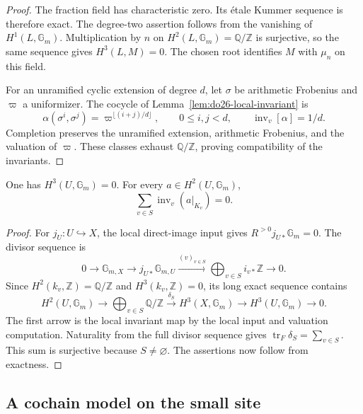 \begin{proof}
The fraction field has characteristic zero. Its \'etale Kummer sequence
is therefore exact. The degree-two assertion follows from the vanishing
of \(H^1(L,\mathbb G_m)\). Multiplication by \(n\) on
\(H^2(L,\mathbb G_m)=\mathbb Q/\mathbb Z\) is surjective, so the
same sequence gives \(H^3(L,M)=0\). The chosen root identifies
\(M\) with \(\mu_n\) on this field.

For an unramified cyclic extension of degree \(d\), let
\(\sigma\) be arithmetic Frobenius and \(\varpi\) a uniformizer.
The cocycle of Lemma~\ref{lem:do26-local-invariant} is
\begin{equation}
\label{eq:do27-carry}
 \alpha(\sigma^i,\sigma^j)=
 \varpi^{\lfloor(i+j)/d\rfloor},\qquad 0\leq i,j<d,
 \qquad \operatorname{inv}_v[\alpha]=1/d.
\end{equation}
Completion preserves the unramified extension, arithmetic Frobenius,
and the valuation of \(\varpi\). These classes exhaust
\(\mathbb Q/\mathbb Z\), proving compatibility of the invariants.
\end{proof}

\begin{lemma}
\label{lem:do27-open}
One has \(H^3(U,\mathbb G_m)=0\). For every
\(a\in H^2(U,\mathbb G_m)\),
\[
 \sum_{v\in S}\operatorname{inv}_v(a|_{K_v})=0.
\]
\end{lemma}

\begin{proof}
For \(j_U:U\hookrightarrow X\), the local direct-image input gives
\(R^{>0}j_{U*}\mathbb G_m=0\). The divisor sequence is
\[
 0\to\mathbb G_{m,X}\to j_{U*}\mathbb G_{m,U}
    \xrightarrow{(v)_{v\in S}}
       \bigoplus_{v\in S}i_{v*}\mathbb Z\to0.
\]
Since \(H^2(k_v,\mathbb Z)=\mathbb Q/\mathbb Z\) and
\(H^3(k_v,\mathbb Z)=0\), its long exact sequence contains
\[
 H^2(U,\mathbb G_m)\longrightarrow
 \bigoplus_{v\in S}\mathbb Q/\mathbb Z
 \xrightarrow{\delta_S}H^3(X,\mathbb G_m)
 \longrightarrow H^3(U,\mathbb G_m)\longrightarrow0.
\]
The first arrow is the local invariant map by the local input and
valuation computation. Naturality from the full divisor sequence gives
\(\operatorname{tr}_F\delta_S=\sum_{v\in S}\).
This sum is surjective because \(S\neq\varnothing\). The assertions
now follow from exactness.
\end{proof}

\subsection{A cochain model on the small site}

